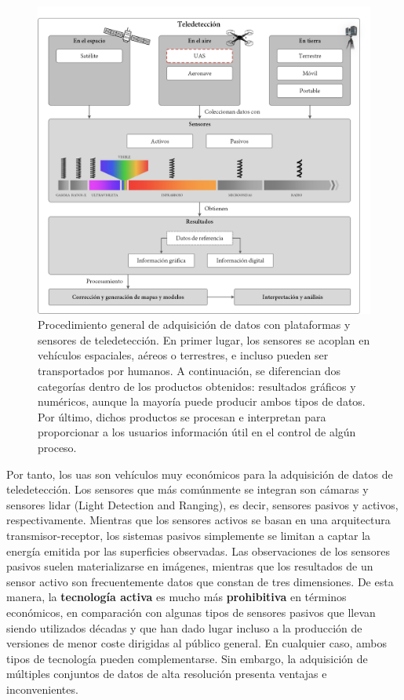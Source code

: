 \begin{figure}[!ht]
	\includegraphics{figs/introduction/introduction_scheme_spanish.png}
	\caption{Procedimiento general de adquisición de datos con plataformas y sensores de teledetección. En primer lugar, los sensores se acoplan en vehículos espaciales, aéreos o terrestres, e incluso pueden ser transportados por humanos. A continuación, se diferencian dos categorías dentro de los productos obtenidos: resultados gráficos y numéricos, aunque la mayoría puede producir ambos tipos de datos. Por último, dichos productos se procesan e interpretan para proporcionar a los usuarios información útil en el control de algún proceso. }
    \label{fig:introduction_scheme_spanish}
\end{figure}

Por tanto, los \acrshort{uas} son vehículos muy económicos para la adquisición de datos de teledetección. Los sensores que más comúnmente se integran son cámaras y sensores \acrshort{lidar} (Light Detection and Ranging), es decir, sensores pasivos y activos, respectivamente. Mientras que los sensores activos se basan en una arquitectura transmisor-receptor, los sistemas pasivos simplemente se limitan a captar la energía emitida por las superficies observadas. Las observaciones de los sensores pasivos suelen materializarse en imágenes, mientras que los resultados de un sensor activo son frecuentemente datos que constan de tres dimensiones. De esta manera, la \textbf{tecnología activa} es mucho más \textbf{prohibitiva} en términos económicos, en comparación con algunas tipos de sensores pasivos que llevan siendo utilizados décadas y que han dado lugar incluso a la producción de versiones de menor coste dirigidas al público general. En cualquier caso, ambos tipos de tecnología pueden complementarse. Sin embargo, la adquisición de múltiples conjuntos de datos de alta resolución presenta ventajas e inconvenientes. 

